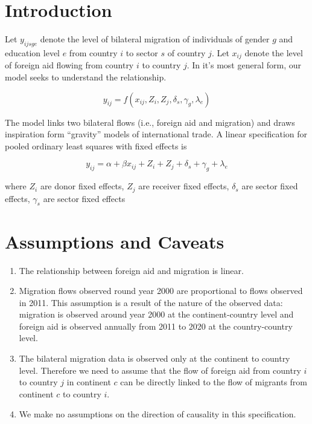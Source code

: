 \documentclass[12pt]{article}
\begin{document}
\section{Introduction}

Let \(y_{ijsge}\) denote the level of bilateral migration of individuals of
gender \(g\) and education level \(e\) from country \(i\) to sector \(s\) of
country \(j\). Let \(x_{ij}\) denote the level of foreign aid flowing from
country \(i\) to country \(j\).  In it's most general form, our model seeks to
understand the relationship.

\begin{equation}
    y_{ij} = f(x_{ij}, Z_{i}, Z_{j}, \delta_{s}, \gamma_{g}, \lambda_{e})
\end{equation}

The model links two bilateral flows (i.e., foreign aid and migration) and draws
inspiration form ``gravity'' models of international trade.  A linear
specification for pooled ordinary least squares with fixed effects is

\begin{equation}
    y_{ij} = \alpha + \beta x_{ij} + Z_{i} + Z_{j} + \delta_{s} + \gamma_{g} + \lambda_{e}
\end{equation}

where \(Z_{i}\) are donor fixed effects, \(Z_{j}\) are receiver fixed effects,
\(\delta_{s}\) are sector fixed effects, \(\gamma_{s}\) are sector fixed effects

\section{Assumptions and Caveats}

\begin{enumerate}
    \item The relationship between foreign aid and migration is linear.
    \item Migration flows observed round year 2000 are proportional to flows
        observed in 2011.  This assumption is a result of the nature of the
        observed data: migration is observed around year 2000 at the
        continent-country level and foreign aid is observed annually from 2011
        to 2020 at the country-country level.
    \item The bilateral migration data is observed only at the continent to
        country level.  Therefore we need to assume that the flow of foreign aid
        from country \(i\) to country \(j\) in continent \(c\) can be directly
        linked to the flow of migrants from continent \(c\) to country \(i\).
    \item We make no assumptions on the direction of causality in this
        specification.
\end{enumerate}
\end{document}
